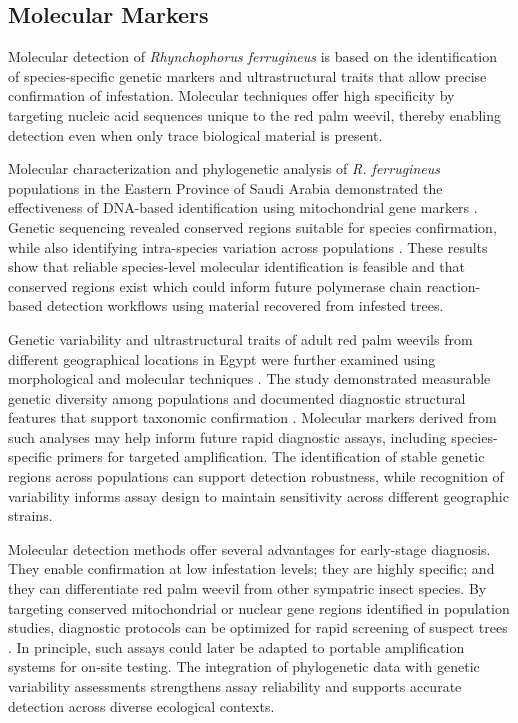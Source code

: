 \documentclass[12pt,a4paper,oneside]{memoir}
\begin{document}
\subsection{Molecular Markers}

Molecular detection of \textit{Rhynchophorus ferrugineus} is based on the identification of species-specific genetic markers and ultrastructural traits that allow precise confirmation of infestation. Molecular techniques offer high specificity by targeting nucleic acid sequences unique to the red palm weevil, thereby enabling detection even when only trace biological material is present.

Molecular characterization and phylogenetic analysis of \textit{R. ferrugineus} populations in the Eastern Province of Saudi Arabia demonstrated the effectiveness of DNA-based identification using mitochondrial gene markers \cite{sabit2021}. Genetic sequencing revealed conserved regions suitable for species confirmation, while also identifying intra-species variation across populations \cite{sabit2021}. These results show that reliable species-level molecular identification is feasible and that conserved regions exist which could inform future polymerase chain reaction-based detection workflows using material recovered from infested trees.

Genetic variability and ultrastructural traits of adult red palm weevils from different geographical locations in Egypt were further examined using morphological and molecular techniques \cite{elzoghby2022}. The study demonstrated measurable genetic diversity among populations and documented diagnostic structural features that support taxonomic confirmation \cite{elzoghby2022}. Molecular markers derived from such analyses may help inform future rapid diagnostic assays, including species-specific primers for targeted amplification. The identification of stable genetic regions across populations can support detection robustness, while recognition of variability informs assay design to maintain sensitivity across different geographic strains.

Molecular detection methods offer several advantages for early-stage diagnosis. They enable confirmation at low infestation levels; they are highly specific; and they can differentiate red palm weevil from other sympatric insect species. By targeting conserved mitochondrial or nuclear gene regions identified in population studies, diagnostic protocols can be optimized for rapid screening of suspect trees \cite{sabit2021,elzoghby2022}. In principle, such assays could later be adapted to portable amplification systems for on-site testing. The integration of phylogenetic data with genetic variability assessments strengthens assay reliability and supports accurate detection across diverse ecological contexts.
\end{document}
